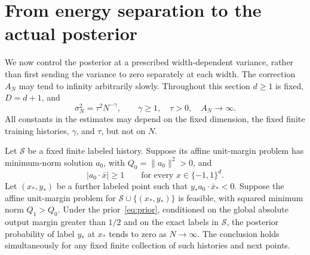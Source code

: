 \section{From energy separation to the actual posterior}
\label{post:section}

We now control the posterior at a prescribed width-dependent variance,
rather than first sending the variance to zero separately at each width.
The correction $A_N$ may tend to infinity arbitrarily slowly.
Throughout this section $d\ge1$ is fixed, $D=d+1$, and
\[
 \sigma_N^2=\tau^2N^{-\gamma},\qquad
 \gamma\ge1,\quad \tau>0,\quad A_N\longrightarrow\infty.
\]
All constants in the estimates may depend on the fixed dimension, the
fixed finite training histories, $\gamma$, and $\tau$, but not on $N$.

\begin{proposition}
\label{thm:direct}
Let $\mathcal S$ be a fixed finite labeled history. Suppose its affine
unit-margin problem has minimum-norm solution $a_0$, with
$Q_0=\|a_0\|^2>0$, and
\[
 |a_0\cdot\bar x|\ge1\qquad\text{for every }x\in\{-1,1\}^d.
\]
Let $(x_*,y_*)$ be a further labeled point such that
$y_*a_0\cdot\bar x_*<0$. Suppose the affine unit-margin problem for
$\mathcal S\cup\{(x_*,y_*)\}$ is feasible, with squared minimum norm
$Q_1>Q_0$.
Under the prior~\eqref{eq:prior}, conditioned on the global absolute
output margin greater than $1/2$ and on the exact labels in $\mathcal S$,
the posterior probability of label $y_*$ at $x_*$ tends to zero as
$N\to\infty$.
The conclusion holds simultaneously for any fixed finite collection of
such histories and next points.
\end{proposition}
